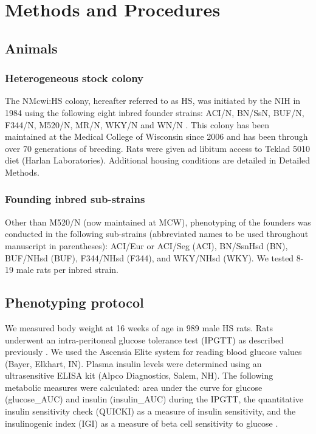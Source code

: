 \section{Methods and Procedures}

\subsection{Animals}

\subsubsection{Heterogeneous stock colony}

The NMcwi:HS colony, hereafter referred to as HS, was initiated by the NIH in 1984 using the following eight inbred founder strains: ACI/N, BN/SsN, BUF/N, F344/N, M520/N, MR/N, WKY/N  and WN/N  \citep{Hansen1984}. This colony has been maintained at the Medical College of Wisconsin since 2006 and has been through over 70 generations of breeding. Rats were given ad libitum access to Teklad 5010 diet (Harlan Laboratories). Additional housing conditions are detailed in Detailed Methods.

\subsubsection{Founding inbred sub-strains}

Other than M520/N (now maintained at MCW), phenotyping of the founders was conducted in the following sub-strains (abbreviated names to be used throughout manuscript in parentheses): ACI/Eur or ACI/Seg (ACI), BN/SsnHsd (BN), BUF/NHsd (BUF), F344/NHsd (F344), and WKY/NHsd (WKY). We tested 8-19 male rats per inbred strain.

\subsection{Phenotyping protocol}

We measured body weight at 16 weeks of age in 989 male HS rats. Rats underwent an intra-peritoneal glucose tolerance test (IPGTT) as described previously \citep{SolbergWoods2010, SolbergWoods2012}. We used the Ascensia Elite system for reading blood glucose values (Bayer, Elkhart, IN). Plasma insulin levels were determined using an ultrasensitive ELISA kit (Alpco Diagnostics, Salem, NH). The following metabolic measures were calculated: area under the curve for glucose (glucose\_AUC) and insulin (insulin\_AUC) during the IPGTT, the quantitative insulin sensitivity check (QUICKI) as a measure of insulin sensitivity, and the insulinogenic index (IGI) as a measure of beta cell sensitivity to glucose \citep{SolbergWoods2012}. 

